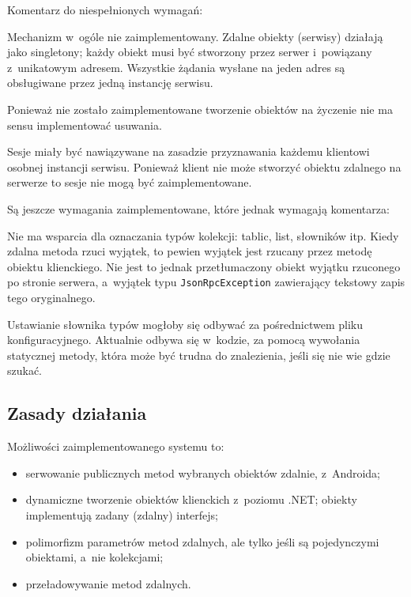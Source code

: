Komentarz do niespełnionych wymagań:
\begin{description}
Mechanizm w~ogóle nie zaimplementowany. Zdalne obiekty (serwisy) działają jako singletony; każdy obiekt musi być stworzony przez serwer i~powiązany z~unikatowym adresem. Wszystkie żądania wysłane na jeden adres są obsługiwane przez jedną instancję serwisu.

Ponieważ nie zostało zaimplementowane tworzenie obiektów na życzenie nie ma sensu implementować usuwania.

Sesje miały być nawiązywane na zasadzie przyznawania każdemu klientowi osobnej instancji serwisu. Ponieważ klient nie może stworzyć obiektu zdalnego na serwerze to sesje nie mogą być zaimplementowane.
\end{description}

Są jeszcze wymagania zaimplementowane, które jednak wymagają komentarza:
\begin{description}
Nie ma wsparcia dla oznaczania typów kolekcji: tablic, list, słowników itp.
Kiedy zdalna metoda rzuci wyjątek, to pewien wyjątek jest rzucany przez metodę obiektu klienckiego. Nie jest to jednak przetłumaczony obiekt wyjątku rzuconego po stronie serwera, a~wyjątek typu \texttt{JsonRpcException} zawierający tekstowy zapis tego oryginalnego.

Ustawianie słownika typów mogłoby się odbywać za pośrednictwem pliku konfiguracyjnego. Aktualnie odbywa się w~kodzie, za pomocą wywołania statycznej metody, która może być trudna do znalezienia, jeśli się nie wie gdzie szukać.
\end{description}


\subsection{Zasady działania}
Możliwości zaimplementowanego systemu to:
\begin{itemize}
	\item serwowanie publicznych metod wybranych obiektów zdalnie, z~Androida;
	\item dynamiczne tworzenie obiektów klienckich z~poziomu .NET; obiekty implementują zadany (zdalny) interfejs;
	\item polimorfizm parametrów metod zdalnych, ale tylko jeśli są pojedynczymi obiektami, a~nie kolekcjami;
	\item przeładowywanie metod zdalnych.
\end{itemize}

